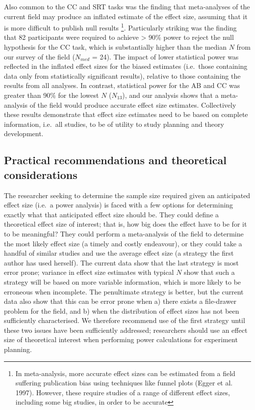 \documentclass{article}
\begin{document}
Also common to the CC and SRT tasks was the finding that meta-analyses of the current field may produce an inflated estimate of the effect size, assuming that it is more difficult to publish null results \footnote{In meta-analysis, more accurate effect sizes can be estimated from a field suffering publication bias using techniques like funnel plots (Egger et al. 1997). However, these require studies of a range of different effect sizes, including some big studies, in order to be accurate}. Particularly striking was the finding that 82 participants were required to achieve \textgreater{} 90\% power to reject the null hypothesis for the CC task, which is substantially higher than the median \(N\) from our survey of the field (\(N_{med}\) = 24). The impact of lower statistical power was reflected in the inflated effect sizes for the biased estimates (i.e.~those containing data only from statistically significant results), relative to those containing the results from all analyses. In contrast, statistical power for the AB and CC was greater than 90\% for the lowest \(N\) (\(N_{13}\)), and our analysis shows that a meta-analysis of the field would produce accurate effect size estimates. Collectively these results demonstrate that effect size estimates need to be based on complete information, i.e.~all studies, to be of utility to study planning and theory development.

\hypertarget{practical-recommendations-and-theoretical-considerations}{%
\subsection{Practical recommendations and theoretical considerations}\label{practical-recommendations-and-theoretical-considerations}}

The researcher seeking to determine the sample size required given an anticipated effect size (i.e.~a power analysis) is faced with a few options for determining exactly what that anticipated effect size should be. They could define a theoretical effect size of interest; that is, how big does the effect have to be for it to be meaningful? They could perform a meta-analysis of the field to determine the most likely effect size (a timely and costly endeavour), or they could take a handful of similar studies and use the average effect size (a strategy the first author has used herself). The current data show that the last strategy is most error prone; variance in effect size estimates with typical \(N\) show that such a strategy will be based on more variable information, which is more likely to be erroneous when incomplete. The penultimate strategy is better, but the current data also show that this can be error prone when a) there exists a file-drawer problem for the field, and b) when the distribution of effect sizes has not been sufficiently characterised. We therefore recommend use of the first strategy until these two issues have been sufficiently addressed; researchers should use an effect size of theoretical interest when performing power calculations for experiment planning.
\end{document}
